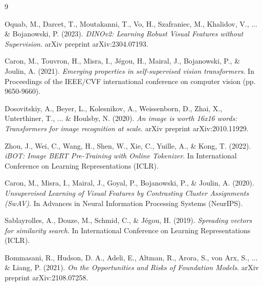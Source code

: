 \documentclass[a4paper,12pt]{report}
\numberwithin{algorithm}{chapter}
\begin{document}
\newpage

\tableofcontents
\newpage

\renewcommand{\listfigurename}{Danh mục hình ảnh}
\listoffigures
\newpage

\renewcommand{\listtablename}{Danh mục bảng}
\listoftables
\newpage





\renewcommand{\bibname}{Tài liệu tham khảo}
\begin{thebibliography}{9}

Oquab, M., Darcet, T., Moutakanni, T., Vo, H., Szafraniec, M., Khalidov, V., ... \& Bojanowski, P. (2023).
\textit{DINOv2: Learning Robust Visual Features without Supervision}.
arXiv preprint arXiv:2304.07193.

Caron, M., Touvron, H., Misra, I., Jégou, H., Mairal, J., Bojanowski, P., \& Joulin, A. (2021).
\textit{Emerging properties in self-supervised vision transformers}.
In Proceedings of the IEEE/CVF international conference on computer vision (pp. 9650-9660).

Dosovitskiy, A., Beyer, L., Kolesnikov, A., Weissenborn, D., Zhai, X., Unterthiner, T., ... \& Houlsby, N. (2020).
\textit{An image is worth 16x16 words: Transformers for image recognition at scale}.
arXiv preprint arXiv:2010.11929.

Zhou, J., Wei, C., Wang, H., Shen, W., Xie, C., Yuille, A., \& Kong, T. (2022).
\textit{iBOT: Image BERT Pre-Training with Online Tokenizer}.
In International Conference on Learning Representations (ICLR).

Caron, M., Misra, I., Mairal, J., Goyal, P., Bojanowski, P., \& Joulin, A. (2020).
\textit{Unsupervised Learning of Visual Features by Contrasting Cluster Assignments (SwAV)}.
In Advances in Neural Information Processing Systems (NeurIPS).

Sablayrolles, A., Douze, M., Schmid, C., \& Jégou, H. (2019).
\textit{Spreading vectors for similarity search}.
In International Conference on Learning Representations (ICLR).

Bommasani, R., Hudson, D. A., Adeli, E., Altman, R., Arora, S., von Arx, S., ... \& Liang, P. (2021).
\textit{On the Opportunities and Risks of Foundation Models}.
arXiv preprint arXiv:2108.07258.

\end{thebibliography}
\end{document}
